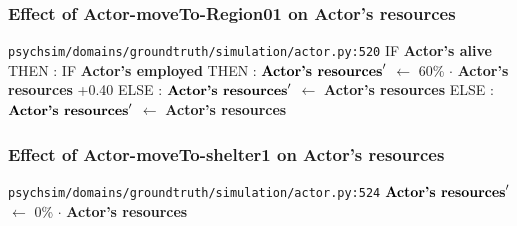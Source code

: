 \documentclass{article}%
\begin{document}
\subsubsection{Effect of Actor{-}moveTo{-}Region01 on Actor's resources}%
\label{ssubsec:Effect of Actor{-}moveTo{-}Region01 on Actor's resources}%
\begin{flushleft}%
\verb|psychsim/domains/groundtruth/simulation/actor.py:520|%
\linebreak%
IF %
\textbf{Actor's alive}%
\linebreak%
\hspace*{2em}%
THEN %
: %
IF %
\textbf{Actor's employed}%
\linebreak%
\hspace*{4em}%
THEN %
: %
$\mbox{\textbf{Actor's resources}} '$%
$\leftarrow$%
60\%%
$\cdot$%
\textbf{Actor's resources}%
+0.40%
\linebreak%
\hspace*{4em}%
ELSE %
: %
$\mbox{\textbf{Actor's resources}} '$%
$\leftarrow$%
\textbf{Actor's resources}%
\linebreak%
\hspace*{2em}%
ELSE %
: %
$\mbox{\textbf{Actor's resources}} '$%
$\leftarrow$%
\textbf{Actor's resources}%
\end{flushleft}

%
\subsubsection{Effect of Actor{-}moveTo{-}shelter1 on Actor's resources}%
\label{ssubsec:Effect of Actor{-}moveTo{-}shelter1 on Actor's resources}%
\begin{flushleft}%
\verb|psychsim/domains/groundtruth/simulation/actor.py:524|%
\linebreak%
$\mbox{\textbf{Actor's resources}} '$%
$\leftarrow$%
0\%%
$\cdot$%
\textbf{Actor's resources}%
\end{flushleft}

%
\end{document}

